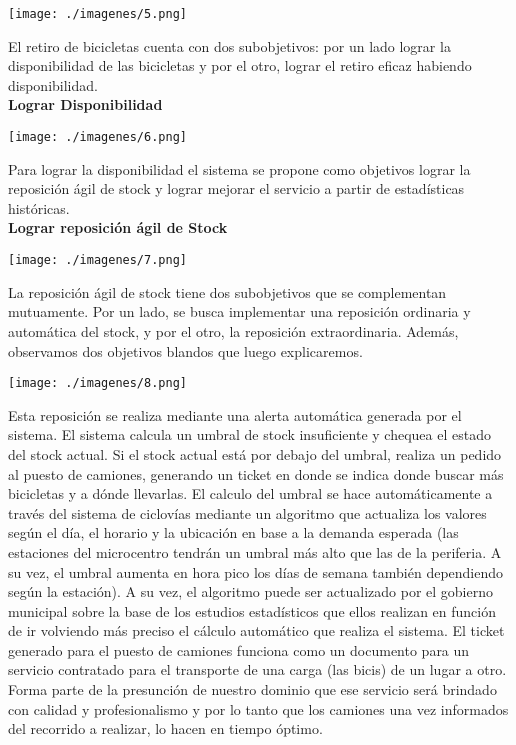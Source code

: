 \documentclass[a4paper, 11pt, spanish]{article}
\begin{document}
\vspace*{0.7cm}
\centerline{\texttt{[image: ./imagenes/5.png]}}
\vspace*{0.7cm}

El retiro de bicicletas cuenta con dos subobjetivos: por un lado lograr la disponibilidad de las bicicletas y por el otro, lograr el retiro eficaz habiendo disponibilidad.\\

\textbf{Lograr Disponibilidad}\\

\vspace*{0.7cm}
\centerline{\texttt{[image: ./imagenes/6.png]}}
\vspace*{0.7cm}

Para lograr la disponibilidad el sistema se propone como objetivos lograr la reposición ágil de stock y lograr mejorar el servicio a partir de estadísticas históricas.\\

\textbf{Lograr reposición ágil de Stock}\\

\vspace*{0.7cm}
\centerline{\texttt{[image: ./imagenes/7.png]}}
\vspace*{0.7cm}

La reposición ágil de stock tiene dos subobjetivos que se complementan mutuamente. Por un lado, se busca implementar una reposición ordinaria y automática del stock, y por el otro, la reposición extraordinaria. Además, observamos dos objetivos blandos que luego explicaremos.

\vspace*{0.7cm}
\centerline{\texttt{[image: ./imagenes/8.png]}}
\vspace*{0.7cm}

Esta reposición se realiza mediante una alerta automática generada por el sistema. El sistema calcula un umbral de stock insuficiente y chequea el estado del stock actual. Si el stock actual está por debajo del umbral, realiza un pedido al puesto de camiones, generando un ticket en donde se indica donde buscar más bicicletas y a dónde llevarlas. El calculo del umbral se hace automáticamente a través del sistema de ciclovías mediante un algoritmo que actualiza los valores según el día, el horario y la ubicación en base a la demanda esperada (las estaciones del microcentro tendrán un umbral más alto que las de la periferia. A su vez, el umbral aumenta en hora pico los días de semana también dependiendo según la estación). A su vez, el algoritmo puede ser actualizado por el gobierno municipal sobre la base de los estudios estadísticos que ellos realizan en función de ir volviendo más preciso el cálculo automático que realiza el sistema. El ticket generado para el puesto de camiones funciona como un documento 
para un servicio contratado para el transporte de una carga (las bicis) de un lugar a otro. Forma parte de la presunción de nuestro dominio que ese servicio será brindado con calidad y profesionalismo y por lo tanto que los camiones una vez informados del recorrido a realizar, lo hacen en tiempo óptimo.
\end{document}
